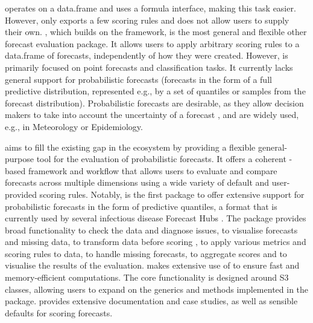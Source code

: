 \documentclass[
]{jss}
\begin{document}
 \citep{scoring} operates on a data.frame and uses a
formula interface, making this task easier. However,  only
exports a few scoring rules and does not allow users to supply their
own.  \citep{yardstick}, which builds on the
 \citep{tidymodels} framework, is the most general and
flexible other forecast evaluation package. It allows users to apply
arbitrary scoring rules to a data.frame of forecasts, independently of
how they were created. However,  is primarily focused on
point forecasts and classification tasks. It currently lacks general
support for probabilistic forecasts (forecasts in the form of a full
predictive distribution, represented e.g., by a set of quantiles or
samples from the forecast distribution). Probabilistic forecasts are
desirable, as they allow decision makers to take into account the
uncertainty of a forecast
\citep{gneitingProbabilisticForecastsCalibration2007}, and are widely
used, e.g., in Meteorology or Epidemiology.

 aims to fill the existing gap in the ecosystem by
providing a flexible general-purpose tool for the evaluation of
probabilistic forecasts. It offers a coherent -based
framework and workflow that allows users to evaluate and compare
forecasts across multiple dimensions using a wide variety of default and
user-provided scoring rules. Notably,  is the first
package to offer extensive support for probabilistic forecasts in the
form of predictive quantiles, a format that is currently used by several
infectious disease Forecast Hubs
\citep{reichCollaborativeMultiyearMultimodel2019, cramerCOVID19ForecastHub2020, sherrattPredictivePerformanceMultimodel2022, bracherNationalSubnationalShortterm2022}.
The package provides broad functionality to check the data and diagnose
issues, to visualise forecasts and missing data, to transform data
before scoring \citep[see][]{bosseScoringEpidemiologicalForecasts2023},
to apply various metrics and scoring rules to data, to handle missing
forecasts, to aggregate scores and to visualise the results of the
evaluation.  makes extensive use of 
\citep{data.table} to ensure fast and memory-efficient computations. The
core functionality is designed around S3 classes, allowing users to
expand on the generics and methods implemented in the package.
 provides extensive documentation and case studies, as
well as sensible defaults for scoring forecasts.
\end{document}
